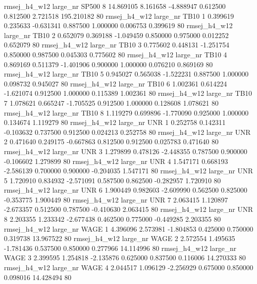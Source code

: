rmsej_h4_w12   large_nr    SP500                 8 14.869105  8.161658  -4.888947 0.612500 0.812500  2.721518  195.210182 80
rmsej_h4_w12   large_nr     TB10                 1  0.399619  0.235633  -0.631341 0.887500 1.000000  0.006753    0.399619 80
rmsej_h4_w12   large_nr     TB10                 2  0.652079  0.369188  -1.049459 0.850000 0.975000  0.012252    0.652079 80
rmsej_h4_w12   large_nr     TB10                 3  0.775602  0.448131  -1.251754 0.850000 0.987500  0.045303    0.775602 80
rmsej_h4_w12   large_nr     TB10                 4  0.869169  0.511379  -1.401906 0.900000 1.000000  0.076210    0.869169 80
rmsej_h4_w12   large_nr     TB10                 5  0.945027  0.565038  -1.522231 0.887500 1.000000  0.098732    0.945027 80
rmsej_h4_w12   large_nr     TB10                 6  1.002361  0.614224  -1.621074 0.912500 1.000000  0.115389    1.002361 80
rmsej_h4_w12   large_nr     TB10                 7  1.078621  0.665247  -1.705525 0.912500 1.000000  0.128608    1.078621 80
rmsej_h4_w12   large_nr     TB10                 8  1.119279  0.699896  -1.770090 0.925000 1.000000  0.134674    1.119279 80
rmsej_h4_w12   large_nr      UNR                 1  0.252758  0.142311  -0.103632 0.737500 0.912500  0.024213    0.252758 80
rmsej_h4_w12   large_nr      UNR                 2  0.471640  0.249175  -0.667863 0.812500 0.912500  0.025783    0.471640 80
rmsej_h4_w12   large_nr      UNR                 3  1.279899  0.478126  -2.448355 0.787500 0.900000 -0.106602    1.279899 80
rmsej_h4_w12   large_nr      UNR                 4  1.547171  0.668193  -2.586139 0.700000 0.900000 -0.204035    1.547171 80
rmsej_h4_w12   large_nr      UNR                 5  1.720910  0.834932  -2.571091 0.587500 0.862500 -0.282957    1.720910 80
rmsej_h4_w12   large_nr      UNR                 6  1.900449  0.982603  -2.609990 0.562500 0.825000 -0.353775    1.900449 80
rmsej_h4_w12   large_nr      UNR                 7  2.063415  1.120897  -2.673357 0.512500 0.787500 -0.410630    2.063415 80
rmsej_h4_w12   large_nr      UNR                 8  2.203355  1.233342  -2.677438 0.462500 0.775000 -0.449285    2.203355 80
rmsej_h4_w12   large_nr     WAGE                 1  4.396096  2.573981  -1.804853 0.425000 0.750000  0.319738   13.967522 80
rmsej_h4_w12   large_nr     WAGE                 2  2.572554  1.495635  -1.781436 0.537500 0.850000  0.277966   14.114996 80
rmsej_h4_w12   large_nr     WAGE                 3  2.399595  1.254818  -2.135876 0.625000 0.837500  0.116006   14.270333 80
rmsej_h4_w12   large_nr     WAGE                 4  2.044517  1.096129  -2.256929 0.675000 0.850000  0.098016   14.428494 80
